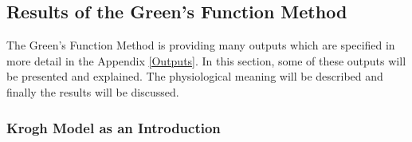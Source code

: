 \subsection{Results of the Green's Function Method}

The Green's Function Method is providing many outputs which are specified in more detail in the Appendix \ref{Outputs}. In this section, some of these outputs will be presented and explained. The physiological meaning will be described and finally the results will be discussed.

\subsubsection*{Krogh Model as an Introduction}
\label{Krogh}

